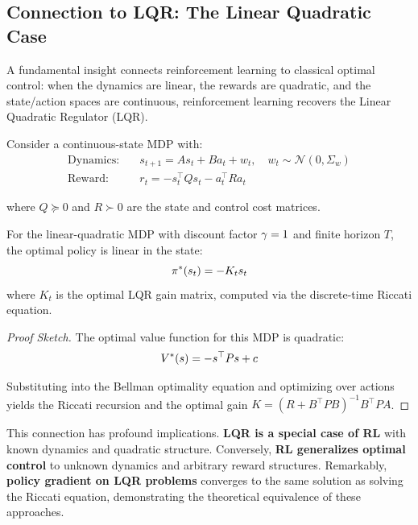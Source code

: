 \subsection{Connection to LQR: The Linear Quadratic Case}

A fundamental insight connects reinforcement learning to classical optimal control: when the dynamics are linear, the rewards are quadratic, and the state/action spaces are continuous, reinforcement learning recovers the Linear Quadratic Regulator (LQR).

Consider a continuous-state MDP with:
\begin{align}
\text{Dynamics:} \quad & s_{t+1} = As_t + Ba_t + w_t, \quad w_t \sim \mathcal{N}(0, \Sigma_w) \\
\text{Reward:} \quad & r_t = -s_t^\top Q s_t - a_t^\top R a_t
\end{align}

where $Q \succeq 0$ and $R \succ 0$ are the state and control cost matrices.

\begin{theorem}
For the linear-quadratic MDP with discount factor $\gamma = 1$ and finite horizon $T$, the optimal policy is linear in the state:
\begin{equation}
\pi^*(s_t) = -K_t s_t
\end{equation}
where $K_t$ is the optimal LQR gain matrix, computed via the discrete-time Riccati equation.
\end{theorem}

\begin{proof}[Proof Sketch]
The optimal value function for this MDP is quadratic:
\begin{equation}
V^*(s) = -s^\top P s + c
\end{equation}

Substituting into the Bellman optimality equation and optimizing over actions yields the Riccati recursion and the optimal gain $K = (R + B^\top P B)^{-1} B^\top P A$.
\end{proof}

This connection has profound implications. \textbf{LQR is a special case of RL} with known dynamics and quadratic structure. Conversely, \textbf{RL generalizes optimal control} to unknown dynamics and arbitrary reward structures. Remarkably, \textbf{policy gradient on LQR problems} converges to the same solution as solving the Riccati equation, demonstrating the theoretical equivalence of these approaches.

